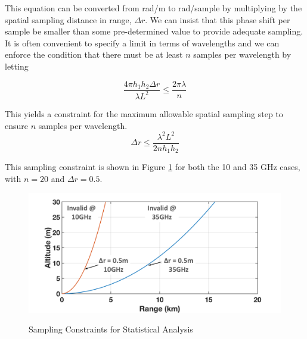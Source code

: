 \noindent This equation can be converted from rad/m to rad/sample by multiplying by the spatial sampling distance in range, $\Delta r$. We can insist that this phase shift per sample be smaller than some pre-determined value to provide adequate sampling. It is often convenient to specify a limit in terms of wavelengths and we can enforce the condition that there must be at least $n$ samples per wavelength by letting

\begin{equation}
\frac{4\pi h_1h_2\Delta r}{\lambda L^2} \leq \frac{2\pi \lambda}{n}
\label{stat_eq:3}
\end{equation}

This yields a constraint for the maximum allowable spatial sampling step to ensure $n$ samples per wavelength.
\begin{equation}
\boxed{\Delta r \leq \frac{\lambda^2 L^2}{2nh_1h_2}}
\label{stat_eq:4}
\end{equation}

This sampling constraint is shown in Figure \ref{stat_fig:3} for both the 10 and 35 GHz cases, with $n = 20$ and $\Delta r = 0.5$.

\begin{figure}[H]
  \begin{center}
\includegraphics[width=5in]{../media/statistics/sampling_constraint.png}
  \end{center}
  \renewcommand{\baselinestretch}{1} \small\normalsize
  \begin{quote}
    \caption[Sampling Constraints for Statistical Analysis]{Sampling Constraints for Statistical Analysis\label{stat_fig:3}}
  \end{quote}
\end{figure}
\renewcommand{\baselinestretch}{2} \small\normalsize

